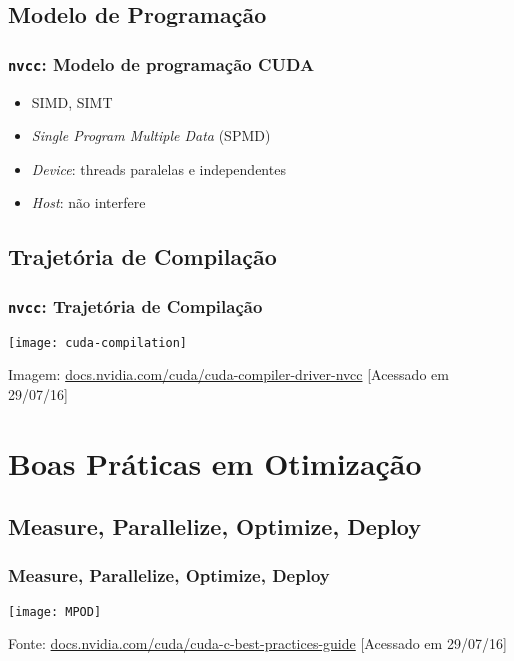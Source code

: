 \documentclass[10pt, compress, aspectratio=43, xcolor={table,usenames,dvipsnames}]{beamer}
\begin{document}
\subsection{Modelo de Programação}

\begin{frame}
    \frametitle{\texttt{nvcc}: Modelo de programação CUDA}
    \begin{itemize}
        \item SIMD, SIMT
        \item \textit{Single Program Multiple Data} (SPMD)
        \item \textit{Device}: \alert{threads} paralelas e \alert{independentes}
        \item \textit{Host}: não interfere
    \end{itemize}
\end{frame}

\subsection{Trajetória de Compilação}

\begin{frame}
    \frametitle{\texttt{nvcc}: Trajetória de Compilação}
    \centering
    \texttt{[image: cuda-compilation]}
    \vfill

    \begin{center}
        \tiny{Imagem: \url{docs.nvidia.com/cuda/cuda-compiler-driver-nvcc} [Acessado em 29/07/16]}
    \end{center}
\end{frame}

\section{Boas Práticas em Otimização}

\subsection{Measure, Parallelize, Optimize, Deploy}

\begin{frame}
    \frametitle{Measure, Parallelize, Optimize, Deploy}
    \centering
    \texttt{[image: MPOD]}
    \vfill

    \begin{center}
        \tiny{Fonte: \url{docs.nvidia.com/cuda/cuda-c-best-practices-guide} [Acessado em 29/07/16]}
    \end{center}
\end{frame}
\end{document}
